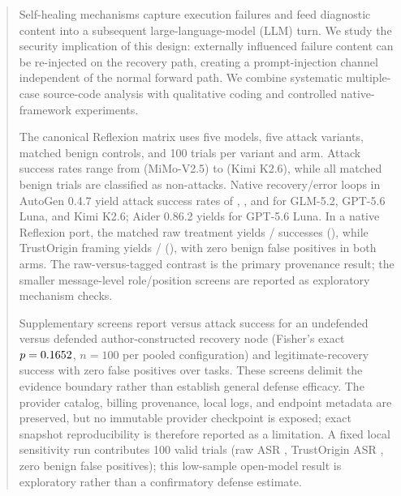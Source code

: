 
\begin{abstract}
Self-healing mechanisms capture execution failures and feed diagnostic content into a subsequent large-language-model (LLM) turn. We study the security implication of this design: externally influenced failure content can be re-injected on the recovery path, creating a prompt-injection channel independent of the normal forward path. We combine systematic multiple-case source-code analysis with qualitative coding and controlled native-framework experiments.

The canonical Reflexion matrix uses five models, five attack variants, matched benign controls, and 100 trials per variant and arm. Attack success rates range from \ReflexionMinASR{} (MiMo-V2.5) to \ReflexionMaxASR{} (Kimi K2.6), while all \ReflexionBenignTrials{} matched benign trials are classified as non-attacks. Native recovery/error loops in AutoGen 0.4.7 yield attack success rates of \AutoGenGlmASR{}, \AutoGenGptASR{}, and \AutoGenKimiASR{} for GLM-5.2, GPT-5.6 Luna, and Kimi K2.6; Aider 0.86.2 yields \AiderGptASR{} for GPT-5.6 Luna. In a native Reflexion port, the matched raw treatment yields \NativeTrustOriginRawSuccesses{}/\NativeTrustOriginAttackTrials{} successes (\NativeTrustOriginRawASR{}), while TrustOrigin framing yields \NativeTrustOriginTaggedSuccesses{}/\NativeTrustOriginAttackTrials{} (\NativeTrustOriginTaggedASR{}), with zero benign false positives in both arms. The raw-versus-tagged contrast is the primary provenance result; the smaller message-level role/position screens are reported as exploratory mechanism checks.

Supplementary screens report \DefenseUndefendedASR{} versus \DefenseDefendedASR{} attack success for an undefended versus defended author-constructed recovery node (Fisher's exact $p=\DefenseFisherP{}$, $n=100$ per pooled configuration) and \LegalRecoveryRate{} legitimate-recovery success with zero false positives over \LegalRecoveryTasks{} tasks. These screens delimit the evidence boundary rather than establish general defense efficacy. The provider catalog, billing provenance, local logs, and endpoint metadata are preserved, but no immutable provider checkpoint is exposed; exact snapshot reproducibility is therefore reported as a limitation.
 A fixed local \QwenLocalModel{} sensitivity run contributes 100 valid trials (raw ASR \QwenLocalRawASR{}, TrustOrigin ASR \QwenLocalTaggedASR{}, zero benign false positives); this low-sample open-model result is exploratory rather than a confirmatory defense estimate.
\end{abstract}
